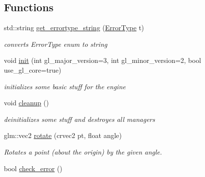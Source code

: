 \subsection*{Functions}
\begin{DoxyCompactItemize}
\item 
\mbox{\label{namespacenta_a426f7af8e14776cbfdac881f2b21aa7d}} 
std\+::string \hyperlink{namespacenta_a426f7af8e14776cbfdac881f2b21aa7d}{get\+\_\+errortype\+\_\+string} (\hyperlink{namespacenta_a1ddeff35318678e360dfa44ca9577b16}{Error\+Type} t)
\begin{DoxyCompactList}\small\item\em converts Error\+Type enum to string \end{DoxyCompactList}\item 
\mbox{\label{namespacenta_a45f05b09d7a4f72d658e70dad161391e}} 
void \hyperlink{namespacenta_a45f05b09d7a4f72d658e70dad161391e}{init} (int gl\+\_\+major\+\_\+version=3, int gl\+\_\+minor\+\_\+version=2, bool use\+\_\+gl\+\_\+core=true)
\begin{DoxyCompactList}\small\item\em initializes some basic stuff for the engine \end{DoxyCompactList}\item 
\mbox{\label{namespacenta_a17dc16b021d0dec3749e422b95d39350}} 
void \hyperlink{namespacenta_a17dc16b021d0dec3749e422b95d39350}{cleanup} ()
\begin{DoxyCompactList}\small\item\em deinitializes some stuff and destroyes all managers \end{DoxyCompactList}\item 
\mbox{\label{namespacenta_ada7b30da347b63962acfdc8f16c1ffb8}} 
glm\+::vec2 \hyperlink{namespacenta_ada7b30da347b63962acfdc8f16c1ffb8}{rotate} (crvec2 pt, float angle)
\begin{DoxyCompactList}\small\item\em Rotates a point (about the origin) by the given angle. \end{DoxyCompactList}\item 
\mbox{\label{namespacenta_a65c4ac3e24918c1a26025984c474b7c8}} 
bool \hyperlink{namespacenta_a65c4ac3e24918c1a26025984c474b7c8}{check\+\_\+error} ()

\end{DoxyCompactItemize}
